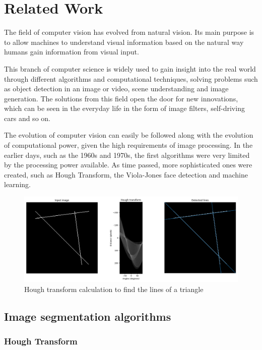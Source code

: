 \chapter{Related Work}
\label{chap:related}

\par The field of computer vision has evolved from natural vision. Its main purpose is to allow machines to understand visual information based on the natural way humans gain information from visual input.
\par This branch of computer science is widely used to gain insight into the real world through different algorithms and computational techniques, solving problems such as object detection in an image or video, scene understanding and image generation. The solutions from this field open the door for new innovations, which can be seen in the everyday life in the form of image filters, self-driving cars and so on.
\par The evolution of computer vision can easily be followed along with the evolution of computational power, given the high requirements of image processing. In the earlier days, such as the 1960s and 1970s, the first algorithms were very limited by the processing power available. As time passed, more sophisticated ones were created, such as Hough Transform, the Viola-Jones face detection and machine learning.

\begin{figure}
    \centering
    \includegraphics[width=0.5\linewidth]{figures/HoughTransform.png}
    \caption{Hough transform calculation to find the lines of a triangle \cite{hough}}
    \label{fig:houghl}
\end{figure}

\section{Image segmentation algorithms}
\label{sec:relatedsec1}

\subsection{Hough Transform}
\label{subsec:relatedsec1subsec1}

